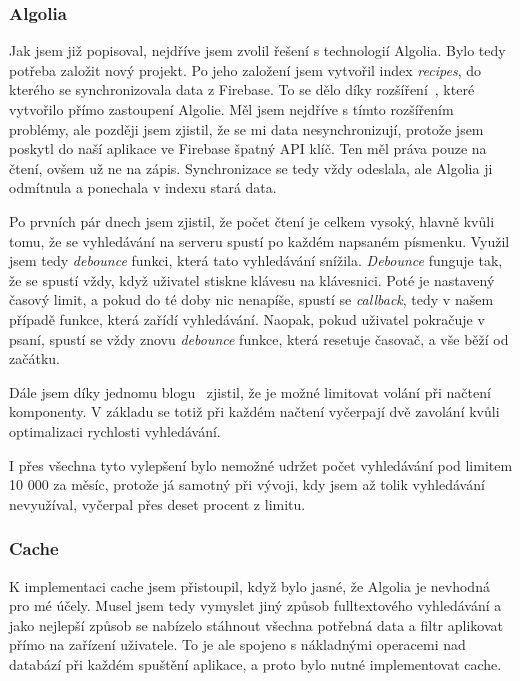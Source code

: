 \subsubsection{Algolia}
Jak jsem již popisoval, nejdříve jsem zvolil řešení s technologií Algolia. Bylo tedy potřeba založit nový projekt. Po jeho založení
jsem vytvořil index \emph{recipes}, do kterého se synchronizovala data z Firebase. To se dělo díky rozšíření~\cite{AlgoliaExtension}, které vytvořilo přímo
zastoupení Algolie. Měl jsem nejdříve s tímto rozšířením problémy, ale později jsem zjistil, že se mi data nesynchronizují, protože jsem
poskytl do naší aplikace ve Firebase špatný API klíč. Ten měl práva pouze na čtení, ovšem už ne na zápis. Synchronizace se tedy vždy odeslala,
ale Algolia ji odmítnula a ponechala v indexu stará data.

Po prvních pár dnech jsem zjistil, že počet čtení je celkem vysoký, hlavně kvůli tomu, že se vyhledávání na serveru spustí po
každém napsaném písmenku. Využil jsem tedy \emph{debounce} funkci, která tato vyhledávání snížila. \emph{Debounce} funguje tak,
že se spustí vždy, když uživatel stiskne klávesu na klávesnici. Poté je nastavený časový limit, a pokud do té doby nic nenapíše,
spustí se \emph{callback}, tedy v našem případě funkce, která zařídí vyhledávání. Naopak, pokud uživatel pokračuje v psaní, spustí
se vždy znovu \emph{debounce} funkce, která resetuje časovač, a vše běží od začátku.

Dále jsem díky jednomu blogu~\cite{AlgoliaBlog} zjistil, že je možné limitovat volání při načtení komponenty. V základu se totiž při každém
načtení vyčerpají dvě zavolání kvůli optimalizaci rychlosti vyhledávání.

I přes všechna tyto vylepšení bylo nemožné udržet počet vyhledávání pod limitem 10 000 za měsíc, protože já samotný při vývoji,
kdy jsem až tolik vyhledávání nevyužíval, vyčerpal přes deset procent z limitu.

\subsubsection{Cache}
K implementaci cache jsem přistoupil, když bylo jasné, že Algolia je nevhodná pro mé účely. Musel jsem tedy vymyslet jiný způsob fulltextového
vyhledávání a jako nejlepší způsob se nabízelo stáhnout všechna potřebná data a filtr aplikovat přímo na zařízení uživatele. To je ale
spojeno s nákladnými operacemi nad databází při každém spuštění aplikace, a proto bylo nutné implementovat cache.

